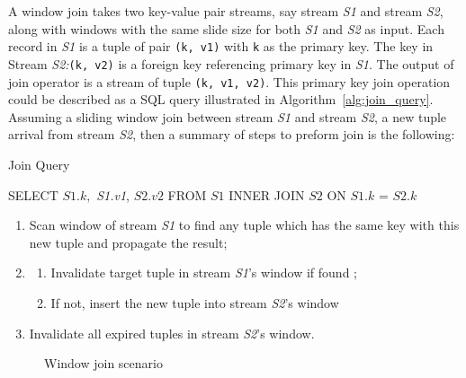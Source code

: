 A window join takes two key-value pair streams, say stream \textit{S1} and stream \textit{S2}, along with windows with the same slide size for both \textit{S1} and \textit{S2} as input. Each record in \textit{S1} is a tuple of pair \texttt{(k, v1)} with \texttt{k} as the primary key. The key in Stream \textit{S2:}\texttt{(k, v2)} is a foreign key referencing primary key in \textit{S1}. The output of join operator is a stream of tuple \texttt{(k, v1, v2)}. This primary key join operation could be described as a SQL query illustrated in Algorithm~\ref{alg:join_query}. Assuming a sliding window join between stream \textit{S1} and stream \textit{S2}, a new tuple arrival from stream \textit{S2}, then a summary of steps to preform join is the following:

\begin{algorithm}
\caption{Join Query}\label{euclid}
\label{alg:join_query}
\begin{algorithmic}[1]
\State SELECT $\textit{S1.k},  $\textit{ S1.v1},  $\textit{S2.v2}$
\State FROM $\textit{S1}$
\State INNER JOIN $\textit{S2}$
\State ON $\textit{S1.k}$ =  $\textit{S2.k}$
\end{algorithmic}
\end{algorithm}

\begin{enumerate}
\item Scan window of stream \textit{S1} to find any tuple which has the same key with this new tuple and propagate the result;
\item 
\begin{enumerate}
\item Invalidate target tuple in stream \textit{S1}'s window if found ;
\item If not, insert the new tuple into stream \textit{S2}'s window 
\end{enumerate}
\item Invalidate all expired tuples in stream \textit{S2}'s window.
\end{enumerate}

\begin{figure}
  \begin{center}
   \caption{Window join scenario}
   \label{fig:window_join}
  \end{center}
\end{figure}

